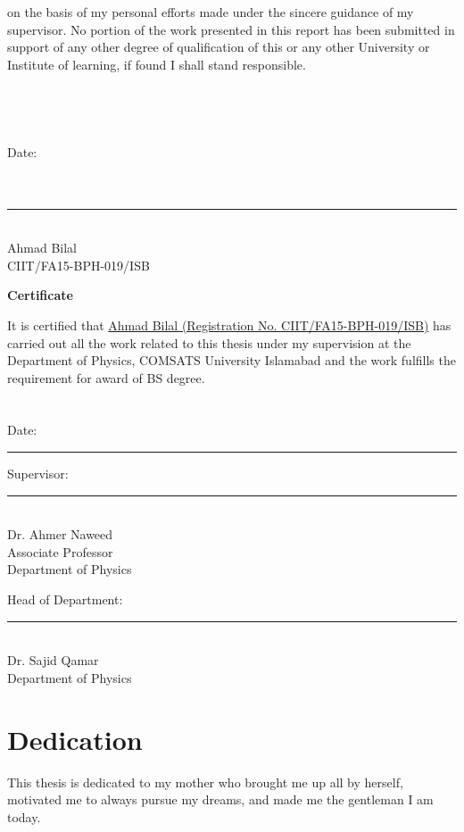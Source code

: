 \documentclass[12pt,twoside]{report}
\begin{document}
on the basis of my personal efforts made under the sincere guidance of my supervisor.
No portion of the work presented in this report has been submitted in support of any
other degree of qualification of this or any other University or Institute of learning, if
found I shall stand responsible.  \\\\\\\\\\
Date: \underline{}  \\\\\\
\begin{flushright}

	\noindent\rule{4cm}{0.4pt} \\  Ahmad Bilal \\   CIIT/FA15-BPH-019/ISB 

\end{flushright}

	
\newpage
\begin{center}
\textbf{\Large{Certificate}}\\
\end{center}
It is certified that \underline{Ahmad Bilal (Registration No. CIIT/FA15-BPH-019/ISB)} has carried out all the work related to this thesis under my supervision at the Department of Physics, COMSATS University Islamabad and the work fulfills the requirement for award of BS degree. \\\\\\
Date: \noindent\rule{3cm}{0.4pt}
\vspace{2.5cm}
\begin{flushright}
Supervisor: \\
\noindent\rule{4cm}{0.4pt}\\
Dr. Ahmer Naweed \\
Associate Professor\\ Department of Physics\\
\end{flushright}
\vspace{3cm}
Head of Department: \\
\noindent\rule{4cm}{0.4pt}\\
Dr. Sajid Qamar \\
Department of Physics
\newpage	


\chapter*{{\Large Dedication}}
\normalfont \large This thesis is dedicated to my mother who brought me up all by herself, motivated me to always pursue my dreams, and made me the gentleman I am today.
\end{document}
